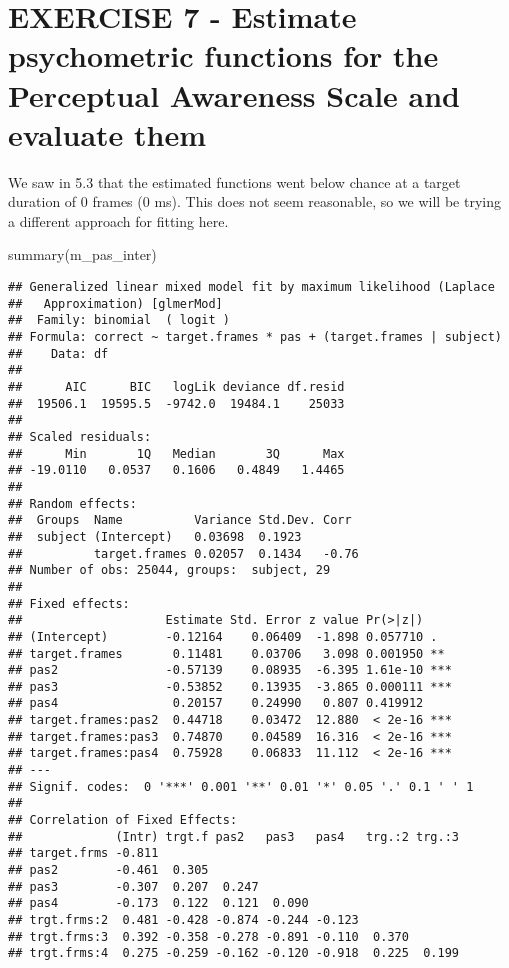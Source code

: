 \documentclass[
]{article}
\newenvironment{Shaded}{\begin{snugshade}}{\end{snugshade}}
\newcommand{\FunctionTok}[1]{\textcolor[rgb]{0.00,0.00,0.00}{#1}}
\newcommand{\NormalTok}[1]{#1}
\begin{document}
\hypertarget{exercise-7---estimate-psychometric-functions-for-the-perceptual-awareness-scale-and-evaluate-them}{%
\section{EXERCISE 7 - Estimate psychometric functions for the Perceptual
Awareness Scale and evaluate
them}\label{exercise-7---estimate-psychometric-functions-for-the-perceptual-awareness-scale-and-evaluate-them}}

We saw in 5.3 that the estimated functions went below chance at a target
duration of 0 frames (0 ms). This does not seem reasonable, so we will
be trying a different approach for fitting here.

\begin{Shaded}
\begin{Highlighting}[]
\FunctionTok{summary}\NormalTok{(m\_pas\_inter)}
\end{Highlighting}
\end{Shaded}

\begin{verbatim}
## Generalized linear mixed model fit by maximum likelihood (Laplace
##   Approximation) [glmerMod]
##  Family: binomial  ( logit )
## Formula: correct ~ target.frames * pas + (target.frames | subject)
##    Data: df
## 
##      AIC      BIC   logLik deviance df.resid 
##  19506.1  19595.5  -9742.0  19484.1    25033 
## 
## Scaled residuals: 
##      Min       1Q   Median       3Q      Max 
## -19.0110   0.0537   0.1606   0.4849   1.4465 
## 
## Random effects:
##  Groups  Name          Variance Std.Dev. Corr 
##  subject (Intercept)   0.03698  0.1923        
##          target.frames 0.02057  0.1434   -0.76
## Number of obs: 25044, groups:  subject, 29
## 
## Fixed effects:
##                    Estimate Std. Error z value Pr(>|z|)    
## (Intercept)        -0.12164    0.06409  -1.898 0.057710 .  
## target.frames       0.11481    0.03706   3.098 0.001950 ** 
## pas2               -0.57139    0.08935  -6.395 1.61e-10 ***
## pas3               -0.53852    0.13935  -3.865 0.000111 ***
## pas4                0.20157    0.24990   0.807 0.419912    
## target.frames:pas2  0.44718    0.03472  12.880  < 2e-16 ***
## target.frames:pas3  0.74870    0.04589  16.316  < 2e-16 ***
## target.frames:pas4  0.75928    0.06833  11.112  < 2e-16 ***
## ---
## Signif. codes:  0 '***' 0.001 '**' 0.01 '*' 0.05 '.' 0.1 ' ' 1
## 
## Correlation of Fixed Effects:
##             (Intr) trgt.f pas2   pas3   pas4   trg.:2 trg.:3
## target.frms -0.811                                          
## pas2        -0.461  0.305                                   
## pas3        -0.307  0.207  0.247                            
## pas4        -0.173  0.122  0.121  0.090                     
## trgt.frms:2  0.481 -0.428 -0.874 -0.244 -0.123              
## trgt.frms:3  0.392 -0.358 -0.278 -0.891 -0.110  0.370       
## trgt.frms:4  0.275 -0.259 -0.162 -0.120 -0.918  0.225  0.199
\end{verbatim}
\end{document}
